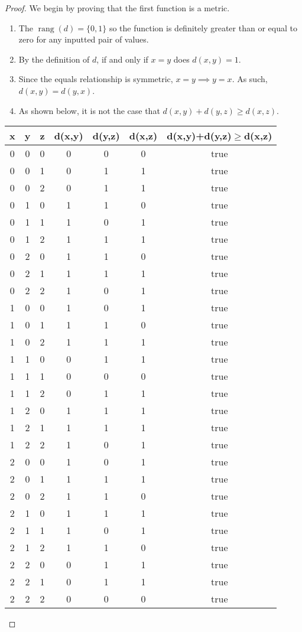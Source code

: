 \documentclass[10pt]{article}
\theoremstyle{definition}
\theoremstyle{plain}
\DeclareMathOperator\rang{rang}
\begin{document}
\begin{proof}
  We begin by proving that the first function is a metric.
  \begin{enumerate}
    \item The $\rang(d)=\{0,1\}$ so the function is definitely greater than or equal to zero for any inputted pair of values.
    \item By the definition of $d$, if and only if $x=y$ does $d(x,y)=1$.
    \item Since the equals relationship is symmetric, $x=y \implies y=x$. As such, $d(x,y) = d(y,x)$.
    \item As shown below, it is not the case that $d(x,y) + d(y,z) \geq d(x,z)$.
  \end{enumerate}

  \begin{center}
    \begin{tabular}{|c|c|c|c|c|c|c|} \hline
      x & y & z & d(x,y) & d(y,z) & d(x,z) & d(x,y)+d(y,z)$\geq$d(x,z) \tabularnewline \hline

      0 & 0 & 0 & 0 & 0 & 0 & true \tabularnewline \hline
      0 & 0 & 1 & 0 & 1 & 1 & true \tabularnewline \hline
      0 & 0 & 2 & 0 & 1 & 1 & true \tabularnewline \hline
      0 & 1 & 0 & 1 & 1 & 0 & true \tabularnewline \hline
      0 & 1 & 1 & 1 & 0 & 1 & true \tabularnewline \hline
      0 & 1 & 2 & 1 & 1 & 1 & true \tabularnewline \hline
      0 & 2 & 0 & 1 & 1 & 0 & true \tabularnewline \hline
      0 & 2 & 1 & 1 & 1 & 1 & true \tabularnewline \hline
      0 & 2 & 2 & 1 & 0 & 1 & true \tabularnewline \hline

      1 & 0 & 0 & 1 & 0 & 1 & true \tabularnewline \hline
      1 & 0 & 1 & 1 & 1 & 0 & true \tabularnewline \hline
      1 & 0 & 2 & 1 & 1 & 1 & true \tabularnewline \hline
      1 & 1 & 0 & 0 & 1 & 1 & true \tabularnewline \hline
      1 & 1 & 1 & 0 & 0 & 0 & true \tabularnewline \hline
      1 & 1 & 2 & 0 & 1 & 1 & true \tabularnewline \hline
      1 & 2 & 0 & 1 & 1 & 1 & true \tabularnewline \hline
      1 & 2 & 1 & 1 & 1 & 1 & true \tabularnewline \hline
      1 & 2 & 2 & 1 & 0 & 1 & true \tabularnewline \hline

      2 & 0 & 0 & 1 & 0 & 1 & true \tabularnewline \hline
      2 & 0 & 1 & 1 & 1 & 1 & true \tabularnewline \hline
      2 & 0 & 2 & 1 & 1 & 0 & true \tabularnewline \hline
      2 & 1 & 0 & 1 & 1 & 1 & true \tabularnewline \hline
      2 & 1 & 1 & 1 & 0 & 1 & true \tabularnewline \hline
      2 & 1 & 2 & 1 & 1 & 0 & true \tabularnewline \hline
      2 & 2 & 0 & 0 & 1 & 1 & true \tabularnewline \hline
      2 & 2 & 1 & 0 & 1 & 1 & true \tabularnewline \hline
      2 & 2 & 2 & 0 & 0 & 0 & true \tabularnewline \hline
    \end{tabular}
  \end{center}


\end{proof}
\end{document}
